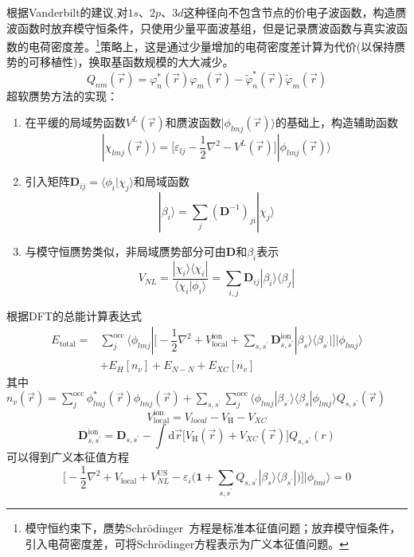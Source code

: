 根据Vanderbilt的建议,对$1s$、$2p$、$3d$这种径向不包含节点的价电子波函数，构造赝波函数时放弃模守恒条件，只使用少量平面波基组，但是记录赝波函数与真实波函数的电荷密度差。\footnote{模守恒约束下，赝势\textrm{Schr\"odinger~}方程是标准本征值问题；放弃模守恒条件，引入电荷密度差，可将\textrm{Schr\"odinger}方程表示为广义本征值问题。}策略上，这是通过少量增加的电荷密度差计算为代价(以保持赝势的可移植性)，换取基函数规模的大大减少。
\begin{equation}
	Q_{nm}(\vec r)=\varphi_n^{\ast}(\vec r)\varphi_m(\vec r)-\tilde\varphi_n^{\ast}(\vec r)\tilde\varphi_m(\vec r)
  \label{eq:uspp_4}
\end{equation}
超软赝势方法的实现：
\begin{enumerate}
	\item 在平缓的局域势函数$V^L(\vec r)$和赝波函数$|\phi_{lmj}(\vec r)\rangle$的基础上，构造辅助函数
\begin{equation}
	|\chi_{lmj}(\vec r)\rangle=\bigg[\varepsilon_{lj}-\dfrac12\nabla^2-V^L(\vec r)\bigg]|\phi_{lmj}(\vec r)\rangle
  \label{eq:uspp_1}
\end{equation}
	\item 引入矩阵$\mathbf{D}_{ij}=\langle\phi_i|\chi_j\rangle$和局域函数
\begin{equation}
	|\beta_i\rangle=\sum_j(\mathbf{D}^{-1})_{ji}|\chi_{j}\rangle
  \label{eq:uspp_2}
\end{equation}
	\item 与模守恒赝势类似，非局域赝势部分可由$\mathbf{D}$和$\beta_i$表示
\begin{equation}
	V_{NL}=\dfrac{|\chi_i\rangle\langle\chi_i|}{\langle\chi_i|\phi_i\rangle}=\sum_{i,j}\mathbf{D}_{ij}|\beta_i\rangle\langle\beta_j|
  \label{eq:uspp_3}
\end{equation}
\end{enumerate}
根据DFT的总能计算表达式
	\begin{equation}
		\begin{aligned}
			E_{\mathrm{total}}=&\sum_j^{\mathrm{occ}}\langle\phi_{lmj}|\bigg[-\dfrac12\nabla^2+V_{\mathrm{local}}^{\mathrm{ion}}+\sum_{s,s^{\prime}}\mathbf{D}_{s,s^{\prime}}^{\mathrm{ion}}|\beta_s\rangle\langle\beta_{s^{\prime}}|\bigg]|\phi_{lmj}\rangle\\
			&+E_{H}[n_v]+E_{N-N}+E_{XC}[n_v]
		\end{aligned}
  \label{eq:uspp_5}
	\end{equation}
其中$n_v(\vec r)=\sum\limits_j^{\mathrm{occ}}\phi_{lmj}^{\ast}(\vec r)\phi_{lmj}(\vec r)+\sum\limits_{s,s^{\prime}}\sum\limits_j^{\mathrm{occ}}\langle\phi_{lmj}|\beta_{s^{\prime}}\rangle\langle\beta_s|\phi_{lmj}\rangle Q_{s,s^{\prime}}(\vec r)$
	$$V_{\mathrm{local}}^{\mathrm{ion}}=V_{local}-V_{\mathrm H}-V_{XC}$$
	$$\mathbf{D}_{s,s^{\prime}}^{\mathrm{ion}}=\mathbf{D}_{s,s^{\prime}}-\int\mathrm{d}\vec r\big[V_{\mathrm{H}}(\vec r)+V_{XC}(\vec r)\big]Q_{s,s^{\prime}}(r)$$
可以得到广义本征值方程
	$$\bigg[-\dfrac12\nabla^2+V_{\mathrm{local}}+V_{NL}^{\mathrm{US}}-\varepsilon_i\bigg(\mathbf{1}+\sum_{s,s^{\prime}}Q_{s,s^{\prime}}|\beta_s\rangle\langle\beta_{s^{\prime}}|\bigg)\bigg]|\phi_{lmi}\rangle=0$$

